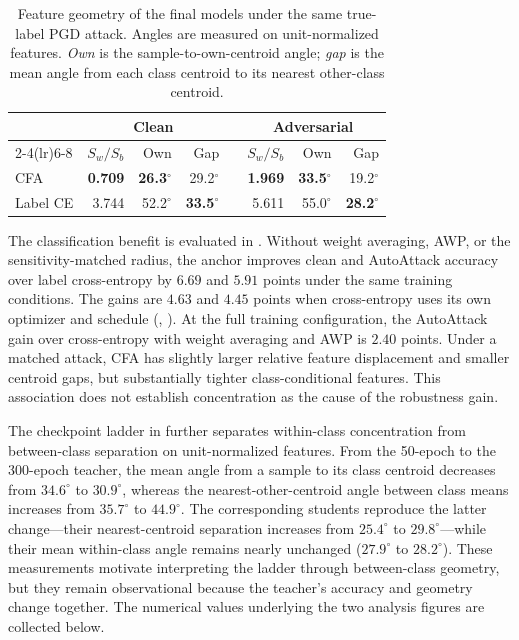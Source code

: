 \begin{table}[!htbp]
  \centering \small \setlength{\tabcolsep}{4pt}
  \caption{Feature geometry of the final models under the same true-label PGD attack. Angles are
  measured on unit-normalized features. \emph{Own} is the
  sample-to-own-centroid angle; \emph{gap} is the mean angle from each class centroid to its
  nearest other-class centroid.}
  \label{tab:anchorgeometry}
  \begin{tabular}{lrrrcrrr}
    \toprule
    & \multicolumn{3}{c}{Clean} & & \multicolumn{3}{c}{Adversarial} \\
    \cmidrule(lr){2-4}\cmidrule(lr){6-8}
    & $S_w/S_b$ & Own & Gap & & $S_w/S_b$ & Own & Gap \\
    \midrule
    CFA & \textbf{0.709} & \textbf{26.3$^\circ$} & 29.2$^\circ$ && \textbf{1.969} & \textbf{33.5$^\circ$} & 19.2$^\circ$ \\
    Label CE & 3.744 & 52.2$^\circ$ & \textbf{33.5$^\circ$} && 5.611 & 55.0$^\circ$ & \textbf{28.2$^\circ$} \\
    \bottomrule
  \end{tabular}
\end{table}


The classification benefit is evaluated in . Without weight averaging, AWP,
or the sensitivity-matched radius, the anchor improves clean and AutoAttack accuracy over label
cross-entropy by $6.69$ and $5.91$ points under the same training conditions. The gains are $4.63$
and $4.45$ points when cross-entropy uses its own optimizer and schedule
(, ). At the full training configuration, the AutoAttack gain
over cross-entropy with weight averaging and AWP is $2.40$ points. Under a matched attack, CFA has
slightly larger relative feature displacement and smaller centroid gaps, but substantially tighter
class-conditional features. This association does not establish concentration as the cause of the
robustness gain.

The checkpoint ladder in  further separates within-class concentration from
between-class separation on unit-normalized features. From the 50-epoch to the 300-epoch teacher,
the mean angle from a sample to its class centroid decreases from $34.6^\circ$ to $30.9^\circ$,
whereas the nearest-other-centroid angle between class means increases from $35.7^\circ$ to $44.9^\circ$. The
corresponding students reproduce the latter change---their nearest-centroid separation increases from
$25.4^\circ$ to $29.8^\circ$---while their mean within-class angle remains nearly unchanged
($27.9^\circ$ to $28.2^\circ$). These measurements motivate interpreting the ladder through
between-class geometry, but they remain observational because the teacher's accuracy and geometry
change together. The numerical values underlying the two analysis figures are collected below.

